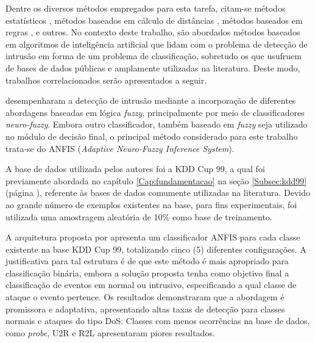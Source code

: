Dentre os diversos métodos empregados para esta tarefa, citam-se métodos estatísticos \cite{jun2001, muzammil2013}, métodos baseados em cálculo de distâncias \cite{zhang2005, syarif2012, aravind2017}, métodos baseados em regras \cite{ilgun1995, roesch1999}, e outros. No contexto deste trabalho, são abordados métodos baseados em algoritmos de inteligência artificial que lidam com o problema de detecção de intrusão em forma de um problema de classificação, sobretudo os que usufruem de bases de dados públicas e amplamente utilizadas na literatura. Deste modo, trabalhos correlacionados serão apresentados a seguir.

 desempenharam a detecção de intrusão mediante a incorporação de diferentes abordagens baseadas em lógica \textit{fuzzy}, principalmente por meio de classificadores \textit{neuro-fuzzy}. Embora outro classificador, também baseado em \textit{fuzzy} seja utilizado no módulo de decisão final, o principal método considerado para este trabalho trata-se do ANFIS (\textit{Adaptive Neuro-Fuzzy Inference System}).

A base de dados utilizada pelos autores foi a KDD Cup 99, a qual foi previamente abordada no capítulo \ref{Cap:fundamentacao} na seção \ref{Subsec:kdd99} (página \pageref{Subsec:kdd99}), referente às bases de dados comumente utilizadas na literatura. Devido ao grande número de exemplos existentes na base, para fins experimentais, foi utilizada uma amostragem aleatória de 10\% como base de treinamento.

A arquitetura proposta por  apresenta um classificador ANFIS para cada classe existente na base KDD Cup 99, totalizando cinco (5) diferentes configurações. A justificativa para tal estrutura é de que este método é mais apropriado para classificação binária, embora a solução proposta tenha como objetivo final a classificação de eventos em normal ou intrusivo, especificando a qual classe de ataque o evento pertence. Os resultados demonstraram que a abordagem é promissora e adaptativa, apresentando altas taxas de detecção para classes normais e ataques do tipo DoS. Classes com menos ocorrências na base de dados, como \textit{probe}, U2R e R2L apresentaram piores resultados.

